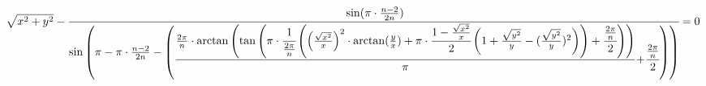 \documentclass[margin=6]{standalone}
\begin{document}
\newcommand{\twopibyn}{ \frac{2\pi}{n} }
\newcommand{\sqrooteddiv}[1]{ \frac{\sqrt{#1 ^2}}{#1} }
$
\sqrt{x^2 + y^2} - \cfrac{ \sin (\pi\cdot\frac{n - 2}{2n}) }{ \sin\left(\pi - \pi\cdot\frac{n-2}{2n} - \left(\raisebox{-1.5ex}{%
$\displaystyle\dfrac{\twopibyn\cdot\arctan\left(\tan\left(\pi\cdot\cfrac{1}{\twopibyn} \left(\left( \sqrooteddiv{x} \right)^2\cdot\arctan(\frac{y}{x}) + \pi\cdot\cfrac{1 - \sqrooteddiv{x}}{2}\left(1 + \sqrooteddiv{y} - (\sqrooteddiv{y})^2 \right)\right) + \cfrac{\twopibyn}{2} \right)\right)}{\pi}$%
}\raisebox{-1.5ex}{$\displaystyle +\cfrac{\twopibyn}{2}$}\right)\right) } = 0
$
\end{document}

